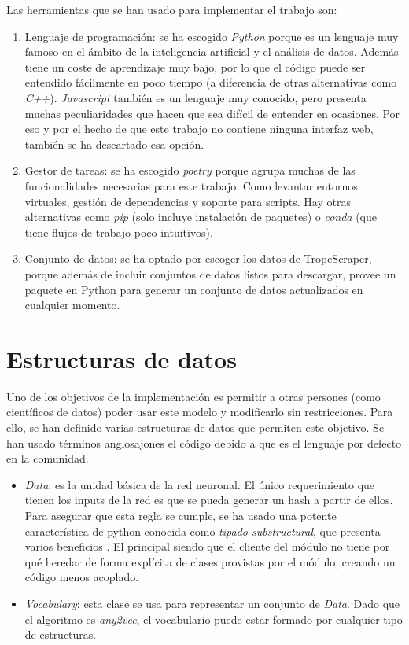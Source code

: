 Las herramientas que se han usado para implementar el trabajo son:

\begin{enumerate}
  \item Lenguaje de programación: se ha escogido \textit{Python} porque es un lenguaje muy famoso en el ámbito de la inteligencia artificial y el análisis de datos. Además
  tiene un coste de aprendizaje muy bajo, por lo que el código puede ser entendido fácilmente en poco tiempo (a diferencia de otras alternativas como \textit{C++}). \textit{Javascript}
  también es un lenguaje muy conocido, pero presenta muchas peculiaridades que hacen que sea difícil de entender en ocasiones. Por eso y por el hecho de que este trabajo no contiene ninguna
  interfaz web, también se ha descartado esa opción.
  \item Gestor de tareas: se ha escogido \textit{poetry} porque agrupa muchas de las funcionalidades necesarias para este trabajo. Como levantar entornos virtuales,
  gestión de dependencias y soporte para scripts. Hay otras alternativas como \textit{pip} (solo incluye instalación de paquetes) o \textit{conda} (que tiene flujos de trabajo poco intuitivos).
  \item Conjunto de datos: se ha optado por escoger los datos de \href{https://github.com/rhgarcia/tropescraper}{TropeScraper}, porque además de incluir conjuntos de datos listos para descargar, provee
  un paquete en Python para generar un conjunto de datos actualizados en cualquier momento.
\end{enumerate}

\section{Estructuras de datos}

Uno de los objetivos de la implementación es permitir a otras persones (como científicos de datos) poder usar este modelo y modificarlo sin restricciones. Para ello, se han definido varias
estructuras de datos que permiten este objetivo. Se han usado términos anglosajones el código debido a que es el lenguaje por defecto en la comunidad.

\begin{itemize}
  \item \textit{Data}: es la unidad básica de la red neuronal. El único requerimiento que tienen los inputs de la red es que se pueda generar un hash a partir de ellos. Para asegurar que esta regla
  se cumple, se ha usado una potente característica de python conocida como \textit{tipado substructural}, que presenta varios beneficios \cite{walker2005substructural}. El principal siendo
  que el cliente del módulo no tiene por qué heredar de forma explícita de clases provistas por el módulo, creando un código menos acoplado.
  \item \textit{Vocabulary}: esta clase se usa para representar un conjunto de \textit{Data}. Dado que el algoritmo es \textit{any2vec}, el vocabulario puede estar formado por cualquier tipo de
  estructuras.
\end{itemize}

